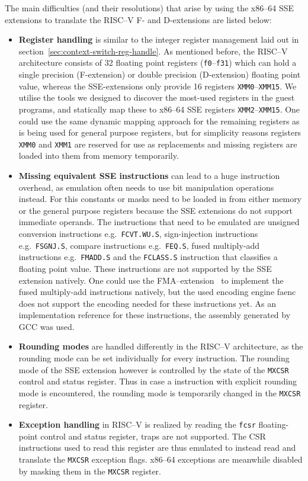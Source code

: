 The main difficulties (and their resolutions) that arise by using the x86--64 SSE extensions to translate the RISC--V F- and D-extensions are listed below:
\begin{itemize}
    \item \textbf{Register handling} is similar to the integer register management laid out in section~\ref{sec:context-switch-reg-handle}.
            As mentioned before, the RISC--V architecture consists of 32 floating point registers (\texttt{f0}--\texttt{f31}) which can hold a single precision (F-extension) or double precision (D-extension) floating point value, whereas the SSE-extensions only provide 16 registers \texttt{XMM0}--\texttt{XMM15}.
            We utilise the tools we designed to discover the most-used registers in the guest programs, and statically map these to x86--64 SSE registers \texttt{XMM2}--\texttt{XMM15}.
            One could use the same dynamic mapping approach for the remaining registers as is being used for general purpose registers, but for simplicity reasons registers \texttt{XMM0} and \texttt{XMM1} are reserved for use as replacements and missing registers are loaded into them from memory temporarily.
    \item \textbf{Missing equivalent SSE instructions} can lead to a huge instruction overhead, as emulation often needs to use bit manipulation operations instead.
            For this constants or masks need to be loaded in from either memory or the general purpose registers because the SSE extensions do not support immediate operands.
            The instructions that need to be emulated are unsigned conversion instructions e.g.~\texttt{FCVT.WU.S}, sign-injection instructions e.g.~\texttt{FSGNJ.S}, compare instructions e.g.~\texttt{FEQ.S}, fused multiply-add instructions e.g.~\texttt{FMADD.S} and the \texttt{FCLASS.S} instruction that classifies a floating point value.
            These instructions are not supported by the SSE extension natively.
			One could use the FMA--extension~\cite[S. 141]{intel2017man} to implement the fused multiply-add instructions natively, but the used encoding engine faenc~\cite{faenc} does not support the encoding needed for these instructions yet.
            As an implementation reference for these instructions, the assembly generated by GCC was used.
    \item \textbf{Rounding modes} are handled differently in the RISC--V architecture, as the rounding mode can be set individually for every instruction.
            The rounding mode of the SSE extension however is controlled by the state of the \texttt{MXCSR} control and status register.
            Thus in case a instruction with explicit rounding mode is encountered, the rounding mode is temporarily changed in the \texttt{MXCSR} register.
    \item \textbf{Exception handling} in RISC--V is realized by reading the \texttt{fcsr} floating-point control and status register, traps are not supported.
            The CSR instructions used to read this register are thus emulated to instead read and translate the \texttt{MXCSR} exception flags.
            x86--64 exceptions are meanwhile disabled by masking them in the \texttt{MXCSR} register.
\end{itemize}


